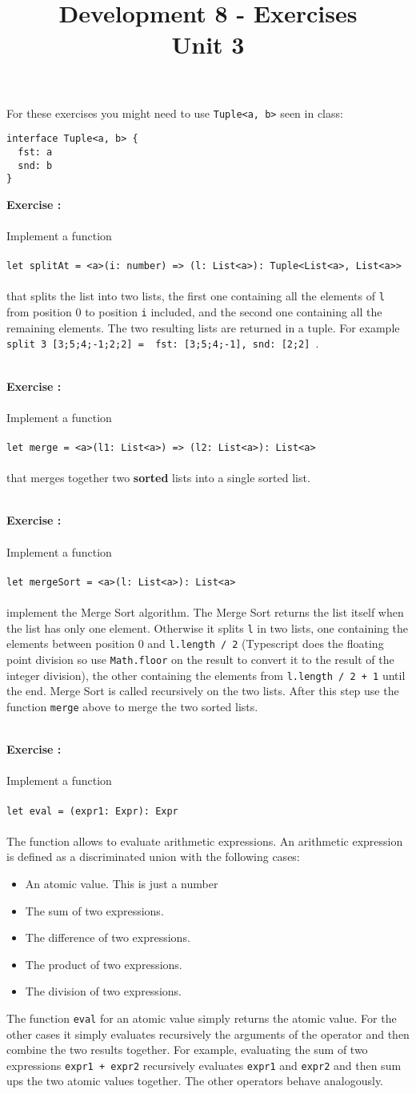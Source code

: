 \documentclass[]{article}
\title{Development 8 - Exercises\\Unit 3}
\author{}
\date{}
\newcounter{ExerciseCount}
\newcommand{\functionEx}[3]{
  Implement a function\\\\
   \texttt{let #1 = #2}\\\\ #3
}
\newcommand{\exercise}[1]{\noindent \textbf{Exercise \theExerciseCount:}\\\\ #1 \addtocounter{ExerciseCount}{1}
}
\begin{document}
\maketitle

\noindent
For these exercises you might need to use \texttt{Tuple<a, b>} seen in class:

\begin{lstlisting}
interface Tuple<a, b> {
  fst: a
  snd: b
}
\end{lstlisting}

\exercise{
  \functionEx{splitAt}{<a>(i: number) => (l: List<a>): Tuple<List<a>, List<a>>}{
    that splits the list into two lists, the first one containing all the elements of \texttt{l} from position 0 to position \texttt{i} included, and the second one containing all the remaining elements. The two resulting lists are returned in a tuple. For example \texttt{split 3 [3;5;4;-1;2;2] = { fst: [3;5;4;-1], snd: [2;2] }}.
}}\\

\exercise{
  \functionEx{merge}{<a>(l1: List<a>) => (l2: List<a>): List<a>}{
   that merges together two \textbf{sorted} lists into a single sorted list.
}}\\

\exercise{
  \functionEx{mergeSort}{<a>(l: List<a>): List<a>}{
  implement the Merge Sort algorithm. The Merge Sort returns the list itself when the list has only one element. Otherwise it splits \texttt{l} in two lists, one containing the elements between position 0 and \texttt{l.length / 2} (Typescript does the floating point division so use \texttt{Math.floor} on the result to convert it to the result of the integer division), the other containing the elements from \texttt{l.length / 2 + 1} until the end. Merge Sort is called recursively on the two lists. After this step use the function \texttt{merge} above to merge the two sorted lists.
}}\\

\exercise{
  \functionEx{eval}{(expr1: Expr): Expr}{
  The function allows to evaluate arithmetic expressions. An arithmetic expression is defined as a discriminated union with the following cases:
  
  \begin{itemize}[noitemsep]
  \item An atomic value. This is just a number
  \item The sum of two expressions.
  \item The difference of two expressions.
  \item The product of two expressions.
  \item The division of two expressions.
  \end{itemize}
  
 The function \texttt{eval} for an atomic value simply returns the atomic value. For the other cases it simply evaluates recursively the arguments of the operator and then combine the two results together. For example, evaluating the sum of two expressions \texttt{expr1 + expr2} recursively evaluates \texttt{expr1} and \texttt{expr2} and then sum ups the two atomic values together. The other operators behave analogously.
}}\\
\end{document}
